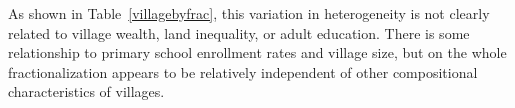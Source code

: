 \documentclass[Eubank_pk_ethnic_sorting.tex]{subfiles}
\begin{document}
As shown in Table~\ref{villagebyfrac}, this variation in heterogeneity is not clearly related to village wealth, land inequality, or adult education. There is some relationship to primary school enrollment rates and village size, but on the whole fractionalization appears to be relatively independent of other compositional characteristics of villages.


\end{document}
